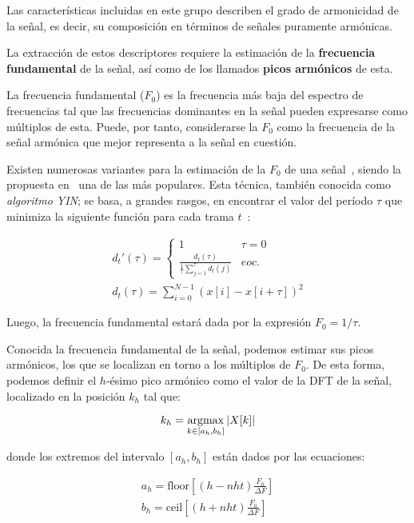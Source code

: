 Las características incluidas en este grupo describen el grado de armonicidad de la señal, es decir, su composición en términos de señales puramente armónicas.

La extracción de estos descriptores requiere la estimación de la \textbf{frecuencia fundamental} de la señal, así como de los llamados \textbf{picos armónicos} de esta.

La frecuencia fundamental ($F_0$) es la frecuencia más baja del espectro de frecuencias tal que las frecuencias dominantes en la señal pueden expresarse como múltiplos de esta.
Puede, por tanto, considerarse la $F_0$ como la frecuencia de la señal armónica que mejor representa a la señal en cuestión.

Existen numerosas variantes para la estimación de la $F_0$ de una señal~\cite{Kim05}, siendo la propuesta en~\cite{Cheveigne02} una de las más populares.
Esta técnica, también conocida como \textit{algoritmo YIN};
se basa, a grandes rasgos, en encontrar el valor del período $\tau$ que minimiza la siguiente función para cada trama $t$~\cite{Gerhard03-2}:

\begin{gather}
    \label{eq:YIN}
    d_t'(\tau) = \begin{cases}
                     1 & \tau = 0 \\
                     \frac{d_t(\tau)}{\frac{1}{\tau}{\sum_{j=1}^{\tau}{d_t(j)}}} & eoc.
    \end{cases}\\
    d_t(\tau) = \sum_{i=0}^{N-1}{(x[i]-x[i+\tau])^2}
\end{gather}

Luego, la frecuencia fundamental estará dada por la expresión $F_0 = 1/\tau$.

Conocida la frecuencia fundamental de la señal, podemos estimar sus picos armónicos, los que se localizan en torno a los múltiplos de $F_0$.
De esta forma, podemos definir el $h$-ésimo pico armónico como el valor de la DFT de la señal, localizado en la posición $k_h$ tal que:

\begin{equation}
    \label{eq:harmonicPeaks}
    k_h = \operatorname*{argmax}_{k\in [a_h,b_h]}|X[k]|
\end{equation}

\noindent
donde los extremos del intervalo $[a_h, b_h]$ están dados por las ecuaciones:

\begin{gather*}
    a_h = \text{floor}\left[ (h - nht)\frac{F_0}{\Delta F} \right] \\
    b_h = \text{ceil}\left[ (h + nht)\frac{F_0}{\Delta F} \right]
\end{gather*}


